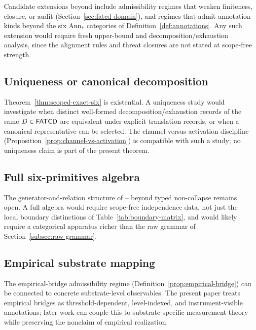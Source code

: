 Candidate extensions beyond \FATCD{} include admissibility regimes
that weaken finiteness, closure, or audit
(Section~\ref{sec:fatcd-domain}), and regimes that admit annotation
kinds beyond the six \(\mathrm{Ann}_*\) categories of
Definition~\ref{def:annotations}. Any such extension would require
fresh upper-bound and decomposition/exhaustion analysis, since the
alignment rules and threat closures are not stated at scope-free
strength.

\subsection{Uniqueness or canonical decomposition}\label{subsec:future-uniqueness}

Theorem~\ref{thm:scoped-exact-six} is existential. A uniqueness study
would investigate when distinct well-formed decomposition/exhaustion
records of the same \(D \in \mathsf{FATCD}{}\) are equivalent under explicit
translation records, or when a canonical representative can be
selected. The channel-versus-activation discipline
(Proposition~\ref{prop:channel-vs-activation}) is compatible with
such a study; no uniqueness claim is part of the present theorem.

\subsection{Full six-primitives algebra}\label{subsec:future-algebra}

The generator-and-relation structure of \Pone{}--\Psix{} beyond
typed non-collapse remains open. A full algebra would require
scope-free independence data, not just the local boundary
distinctions of Table~\ref{tab:boundary-matrix}, and would likely
require a categorical apparatus richer than the raw grammar of
Section~\ref{subsec:raw-grammar}.

\subsection{Empirical substrate mapping}\label{subsec:future-substrate}

The empirical-bridge admissibility regime
(Definition~\ref{prop:empirical-bridge}) can be connected to
concrete substrate-level observables. The present paper treats
empirical bridges as threshold-dependent, level-indexed, and
instrument-visible annotations; later work can couple this to
substrate-specific measurement theory while preserving the nonclaim
of empirical realization.

